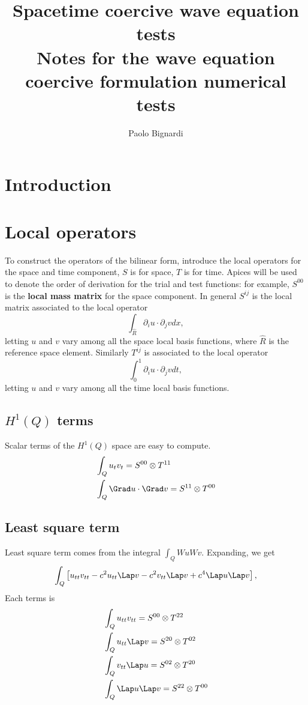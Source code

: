 \documentclass[]{report}
\title{%
    Spacetime coercive wave equation tests\\
    \large Notes for the wave equation coercive formulation 
    numerical tests}
\author{Paolo Bignardi}
\begin{document}
    \maketitle

    \section*{Introduction}

    \section*{Local operators}
    To construct the operators of the bilinear form, introduce the local operators for the space and time component, $S$ is for space, $T$ is for time. 
    Apices will be used to denote the order of derivation for the trial and test functions: for example, $S^{00}$ is the \textbf{local mass matrix} for the space component. In general $S^{ij}$ is the local matrix associated to the local operator
    \begin{equation*}
        \int_{\hat{R}} \partial_i u \cdot \partial_j v dx,
    \end{equation*}
    letting $u$ and $v$ vary among all the space local basis functions, where $\hat{R}$ is the reference space element.
    Similarly $T^{ij}$ is associated to the local operator 
    \begin{equation*}
        \int_0^1 \partial_i u \cdot \partial_j v dt,
    \end{equation*}
    letting $u$ and $v$ vary among all the time local basis functions.
    
    \subsection*{$H^1(Q)$ terms}
    Scalar terms of the $H^1(Q)$ space are easy to compute.
    \begin{align*}
        &\int_Q u_tv_t = S^{00} \otimes T^{11}\\
        &\int_Q \Grad u \cdot \Grad v = S^{11} \otimes T^{00}
    \end{align*}

    \subsection*{Least square term}
    Least square term comes from the integral $\int_Q Wu Wv$. Expanding, we get
    \begin{equation*}
        \int_Q \left[ u_{tt} v_{tt} - c^2 u_{tt} \Lap v - c^2 v_{tt} \Lap v +c^4 \Lap u \Lap v \right],
    \end{equation*}
    Each terms is
    \begin{align*}
        &\int_Q u_{tt}v_{tt} = S^{00} \otimes T^{22}\\
        &\int_Q u_{tt}\Lap v = S^{20} \otimes T^{02}\\
        &\int_Q v_{tt}\Lap u = S^{02} \otimes T^{20}\\
        &\int_Q \Lap u \Lap v = S^{22} \otimes T^{00}
    \end{align*}
\end{document}
